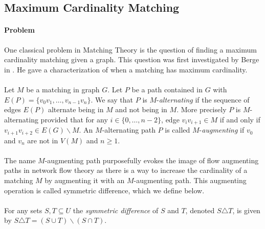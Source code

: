 \subsection{Maximum Cardinality Matching}\label{subsec:mcm}
\paragraph{Problem} One classical problem in Matching Theory is the question of finding a maximum cardinality matching given a graph. This question was first investigated by Berge in \cite{berge1957two}. He gave a characterization of when a matching has maximum cardinality. 

\paragraph{} Let $M$ be a matching in graph $G$. Let $P$ be a path contained in $G$ with $E(P) = \{v_0v_1, \dots, v_{n-1}v_n\}$. We say that $P$ is $M$-{\it alternating} if the sequence of edges $E(P)$ alternate being in $M$ and not being in $M$. More precisely $P$ is $M$-alternating provided that for any $i \in \{0, \dots, n-2\}$, edge $v_iv_{i+1} \in M$ if and only if $v_{i+1}v_{i+2} \in E(G) \backslash M$. An $M$-alternating path $P$ is called $M$-{\it augmenting} if $v_0$ and $v_n$ are not in $V(M)$ and $n \geq 1$.
 
\paragraph{}
The name $M$-augmenting path purposefully evokes the image of flow augmenting paths in network flow theory as there is a way to increase the cardinality of a matching $M$ by augmenting it with an $M$-augmenting path. This augmenting operation is called symmetric difference, which we define below.
\paragraph{} For any sets $S,T \subseteq U$ the {\it symmetric difference} of $S$ and $T$, denoted $S \triangle T$, is given by $S \triangle T = (S \cup T) \backslash (S \cap T)$. 

